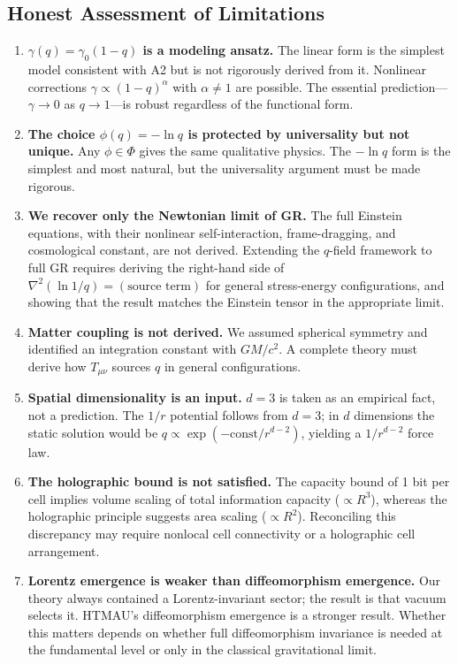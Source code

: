 \documentclass[aps,prd,twocolumn,showpacs,superscriptaddress,preprintnumbers]{revtex4-2}
\begin{document}
\subsection{Honest Assessment of Limitations}

\begin{enumerate}
    \item \textbf{$\gamma(q)=\gamma_0(1-q)$ is a modeling ansatz.} The linear form is the simplest model consistent with A2 but is not rigorously derived from it. Nonlinear corrections $\gamma\propto(1-q)^\alpha$ with $\alpha\neq1$ are possible. The essential prediction---$\gamma\to0$ as $q\to1$---is robust regardless of the functional form.

    \item \textbf{The choice $\phi(q)=-\ln q$ is protected by universality but not unique.} Any $\phi\in\Phi$ gives the same qualitative physics. The $-\ln q$ form is the simplest and most natural, but the universality argument must be made rigorous.

    \item \textbf{We recover only the Newtonian limit of GR.} The full Einstein equations, with their nonlinear self-interaction, frame-dragging, and cosmological constant, are not derived. Extending the $q$-field framework to full GR requires deriving the right-hand side of $\nabla^2(\ln 1/q)=(\text{source term})$ for general stress-energy configurations, and showing that the result matches the Einstein tensor in the appropriate limit.

    \item \textbf{Matter coupling is not derived.} We assumed spherical symmetry and identified an integration constant with $GM/c^2$. A complete theory must derive how $T_{\mu\nu}$ sources $q$ in general configurations.

    \item \textbf{Spatial dimensionality is an input.} $d=3$ is taken as an empirical fact, not a prediction. The $1/r$ potential follows from $d=3$; in $d$ dimensions the static solution would be $q\propto\exp(-\text{const}/r^{d-2})$, yielding a $1/r^{d-2}$ force law.

    \item \textbf{The holographic bound is not satisfied.} The capacity bound of 1 bit per cell implies volume scaling of total information capacity ($\propto R^3$), whereas the holographic principle suggests area scaling ($\propto R^2$). Reconciling this discrepancy may require nonlocal cell connectivity or a holographic cell arrangement.

    \item \textbf{Lorentz emergence is weaker than diffeomorphism emergence.} Our theory always contained a Lorentz-invariant sector; the result is that vacuum selects it. HTMAU's diffeomorphism emergence is a stronger result. Whether this matters depends on whether full diffeomorphism invariance is needed at the fundamental level or only in the classical gravitational limit.
\end{enumerate}
\end{document}
